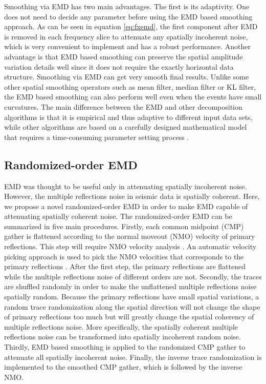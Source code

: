 Smoothing via EMD has two main advantages. The first is its adaptivity. One does not need to decide any parameter before using the EMD based smoothing approach. As can be seen in equation \ref{eq:fxemd}, the first component after EMD is removed in each frequency slice to attenuate any spatially incoherent noise, which is very convenient to implement and has a robust performance. Another advantage is that EMD based smoothing can preserve the spatial amplitude variation details well since it does not require the exactly horizontal data structure. Smoothing via EMD can get very smooth final results. Unlike some other spatial smoothing operators such as mean filter, median filter or KL filter, the EMD based smoothing can also perform well even when the events have small curvatures. The main difference between the EMD and other decomposition algorithms is that it is empirical and thus adaptive to different input data sets, while other algorithms are based on a carefully designed mathematical model that requires a time-consuming parameter setting process \cite{liuwei2016,liuwei2016vmd,huijian2016}.





\subsection{Randomized-order EMD}
EMD was thought to be useful only in attenuating spatially incoherent noise. However, the multiple reflections noise in seismic data is spatially coherent. Here, we propose a novel randomized-order EMD in order to make EMD capable of attenuating spatially coherent noise. The randomized-order EMD can be summarized in five main procedures. Firstly, each common midpoint (CMP) gather is flattened according to the normal moveout (NMO) velocity of primary reflections. This step will require NMO velocity analysis \cite{yangkang2015vel,shuwei2016vscan}. An automatic velocity picking approach is used to pick the NMO velocities that corresponds to the primary reflections \cite{fomel20091}. After the first step, the primary reflections are flattened while the multiple reflections noise of different orders are not. Secondly, the traces are shuffled randomly in order to make the unflattened multiple reflections noise spatially random. Because the primary reflections have small spatial variations, a random trace randomization along the spatial direction will not change the shape of primary reflections too much but will greatly change the spatial coherency of multiple reflections noise. More specifically, the spatially coherent multiple reflections noise can be transformed into spatially incoherent random noise. Thirdly, EMD based smoothing is applied to the randomized CMP gather to attenuate all spatially incoherent noise. Finally, the inverse trace randomization is implemented to the smoothed CMP gather, which is followed by the inverse NMO.  

